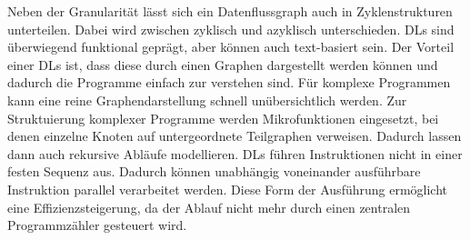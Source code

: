 \documentclass{article}
\begin{document}
    Neben der Granularität lässt sich ein Datenflussgraph auch in Zyklenstrukturen unterteilen. 
    Dabei wird zwischen zyklisch und azyklisch unterschieden. \cite{8} %
    DLs sind überwiegend funktional geprägt, aber können auch text-basiert sein. \cite{2}
    Der Vorteil einer DLs ist, dass diese durch einen Graphen dargestellt werden können \cite{11} und dadurch die Programme einfach zur verstehen sind. \cite{6}
    Für komplexe Programmen kann eine reine Graphendarstellung schnell unübersichtlich werden. Zur Struktuierung komplexer Programme werden Mikrofunktionen eingesetzt, bei denen einzelne Knoten auf untergeordnete Teilgraphen verweisen. Dadurch lassen dann auch rekursive Abläufe modellieren. \cite{11}    
    DLs führen Instruktionen nicht in einer festen Sequenz aus. Dadurch können unabhängig voneinander ausführbare Instruktion parallel verarbeitet werden. \cite{1}
    Diese Form der Ausführung ermöglicht eine Effizienzsteigerung, da der Ablauf nicht mehr durch einen zentralen Programmzähler gesteuert wird. \cite{2}
\end{document}
